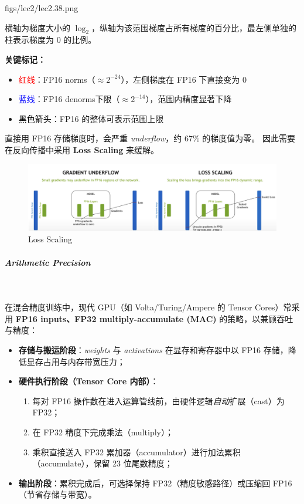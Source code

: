 \MarginImageWithNote
  {figs/lec2/lec2.38.png}
  {}
  {
  \footnotesize
  横轴为梯度大小的 $\log_2$，纵轴为该范围梯度占所有梯度的百分比，最左侧单独的柱表示梯度为 0 的比例。

  \textbf{关键标记：}
  \begin{itemize}[leftmargin=0.5em]
      \item \textcolor{red}{红线}：FP16 norms（$\approx 2^{-24}$），左侧梯度在 FP16 下直接变为 0
      \item \textcolor{blue}{蓝线}：FP16 denorms下限（$\approx 2^{-14}$），范围内精度显著下降
      \item \textcolor{black}{黑色箭头}：FP16 的整体可表示范围上限
  \end{itemize}

  直接用 FP16 存储梯度时，会严重 \emph{underflow}，约 $67\%$ 的梯度值为零。
  因此需要在反向传播中采用 \textbf{Loss Scaling} 来缓解。
  }


\begin{figure}[htbp]
  \centering
  \includegraphics[width=0.8\linewidth]{figs/lec2/lec2.37.png}
  \caption{Loss Scaling}
\label{Loss Scaling}
\end{figure}


\clearpage
\subparagraph{Arithmetic Precision}~{}

在混合精度训练中，现代 GPU（如 Volta/Turing/Ampere 的 Tensor Cores）常采用
\textbf{FP16 inputs、FP32 multiply-accumulate (MAC)} 的策略，以兼顾吞吐与精度：

\begin{itemize}[leftmargin=1em]
    \item \textbf{存储与搬运阶段}：\textit{weights} 与 \textit{activations} 在显存和寄存器中以 FP16 存储，降低显存占用与内存带宽压力；
    \item \textbf{硬件执行阶段（Tensor Core 内部）}：
    \begin{enumerate}[label= (\alph*), leftmargin=1.5em]
        \item 每对 FP16 操作数在进入运算管线前，由硬件逻辑\emph{自动}扩展（cast）为 FP32；
        \item 在 FP32 精度下完成乘法（multiply）；
        \item 乘积直接送入 FP32 累加器（accumulator）进行加法累积（accumulate），保留 23 位尾数精度；
    \end{enumerate}
    \item \textbf{输出阶段}：累积完成后，可选择保持 FP32（精度敏感路径）或压缩回 FP16（节省存储与带宽）。
\end{itemize}


